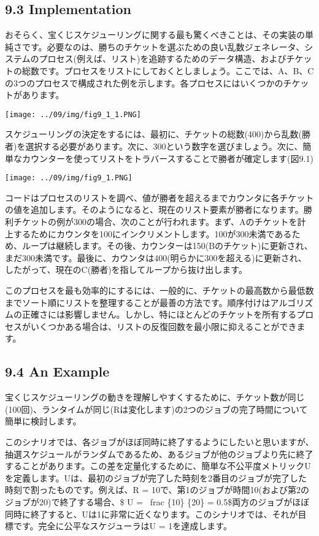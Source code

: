 \hypertarget{implementation}{%
\subsection*{9.3 Implementation}\label{implementation}}

おそらく、宝くじスケジューリングに関する最も驚くべきことは、その実装の単純さです。必要なのは、勝ちのチケットを選ぶための良い乱数ジェネレータ、システムのプロセス(例えば、リスト)を追跡するためのデータ構造、およびチケットの総数です。プロセスをリストにしておくとしましょう。ここでは、A、B、Cの3つのプロセスで構成された例を示します。各プロセスにはいくつかのチケットがあります。

\texttt{[image: ../09/img/fig9\_1\_1.PNG]}

スケジューリングの決定をするには、最初に、チケットの総数(400)から乱数(勝者)を選択する必要があります。次に、300という数字を選びましょう。次に、簡単なカウンターを使ってリストをトラバースすることで勝者が確定します(図9.1)

\texttt{[image: ../09/img/fig9\_1.PNG]}

コードはプロセスのリストを調べ、値が勝者を超えるまでカウンタに各チケットの値を追加します。そのようになると、現在のリスト要素が勝者になります。勝利チケットの例が300の場合、次のことが行われます。まず、Aのチケットを計上するためにカウンタを100にインクリメントします。100が300未満であるため、ループは継続します。その後、カウンターは150(Bのチケット)に更新され、まだ300未満です。最後に、カウンタは400(明らかに300を超える)に更新され、したがって、現在のC(勝者)を指してループから抜け出します。

このプロセスを最も効率的にするには、一般的に、チケットの最高数から最低数までソート順にリストを整理することが最善の方法です。順序付けはアルゴリズムの正確さには影響しません。しかし、特にほとんどのチケットを所有するプロセスがいくつかある場合は、リストの反復回数を最小限に抑えることができます。

\hypertarget{an-example}{%
\subsection*{9.4 An Example}\label{an-example}}

宝くじスケジューリングの動きを理解しやすくするために、チケット数が同じ(100回)、ランタイムが同じ(Rは変化します)の2つのジョブの完了時間について簡単に検討します。

このシナリオでは、各ジョブがほぼ同時に終了するようにしたいと思いますが、抽選スケジュールがランダムであるため、あるジョブが他のジョブより先に終了することがあります。この差を定量化するために、簡単な不公平度メトリックUを定義します。Uは、最初のジョブが完了した時刻を2番目のジョブが完了した時刻で割ったものです。例えば、R
= 10で、第1のジョブが時間10(および第2のジョブが20)で終了する場合、\$ U =
~frac \{10\} \{20\} =
0.5\$両方のジョブがほぼ同時に終了すると、Uは1に非常に近くなります。このシナリオでは、それが目標です。完全に公平なスケジューラはU
= 1を達成します。

